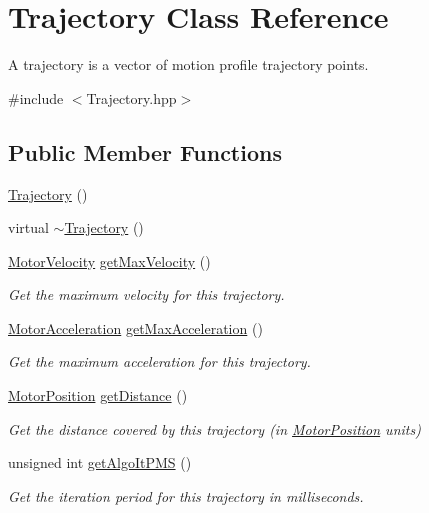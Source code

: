 \hypertarget{classTrajectory}{\section{Trajectory Class Reference}
\label{classTrajectory}
}


A trajectory is a vector of motion profile trajectory points.  




{\ttfamily \#include $<$Trajectory.\-hpp$>$}

\subsection*{Public Member Functions}
\begin{DoxyCompactItemize}
\item 
\hyperlink{classTrajectory_aa340ba80f1f4d1aa39f19f069d5d8089}{Trajectory} ()
\item 
virtual \hyperlink{classTrajectory_ac673c37025ca5353ad99ab41c936e75d}{$\sim$\-Trajectory} ()
\item 
\hyperlink{classMotorVelocity}{Motor\-Velocity} \hyperlink{classTrajectory_a6b978d0ab6ef13bbf3034b1f6d37180b}{get\-Max\-Velocity} ()
\begin{DoxyCompactList}\small\item\em Get the maximum velocity for this trajectory. \end{DoxyCompactList}\item 
\hyperlink{classMotorAcceleration}{Motor\-Acceleration} \hyperlink{classTrajectory_ad05719b4fb4d03288ea1adb8c110059c}{get\-Max\-Acceleration} ()
\begin{DoxyCompactList}\small\item\em Get the maximum acceleration for this trajectory. \end{DoxyCompactList}\item 
\hyperlink{classMotorPosition}{Motor\-Position} \hyperlink{classTrajectory_a03e1d57ceece06e7af1250bcc72ae265}{get\-Distance} ()
\begin{DoxyCompactList}\small\item\em Get the distance covered by this trajectory (in \hyperlink{classMotorPosition}{Motor\-Position} units) \end{DoxyCompactList}\item 
unsigned int \hyperlink{classTrajectory_a6b8d62dd1ce207ce77eb1fe5e7937f2c}{get\-Algo\-It\-P\-M\-S} ()
\begin{DoxyCompactList}\small\item\em Get the iteration period for this trajectory in milliseconds. \end{DoxyCompactList}\item 

\end{DoxyCompactItemize}
